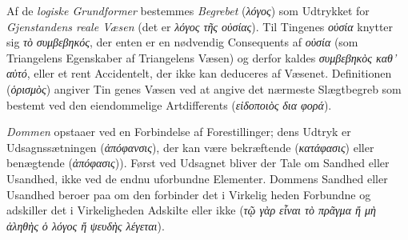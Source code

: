 \documentclass[12pt,a4paper]{book}
\newcommand{\gk}[1]{\textit{#1}}
\begin{document}
Af de \emph{logiske Grundformer} bestemmes \emph{Begrebet}
(\gk{λόγος}) som Udtrykket for \emph{Gjenstandens reale Væsen} (det
er \gk{λόγος τῆς οὐσίας}). Til Tingenes \gk{οὐσία} knytter sig \gk{τὸ}
\gk{συμβεβηκός}, der enten er en nødvendig Consequents af \gk{οὐσία}
(som Triangelens Egenskaber af Triangelens Væsen) og derfor
kaldes \gk{συμβεβηκὸς καθ' αὑτό}, eller et rent Accidentelt, der ikke
kan deduceres af Væsenet. Definitionen (\gk{ὁρισμὸς}) angiver Tin\-%
genes Væsen ved at angive det nærmeste Slægtbegreb som
bestemt ved den eiendommelige Artdifferents (\gk{εἰδοποιὸς δια\-%
φορά}).

\emph{Dommen} opstaaer ved en Forbindelse af Forestillinger;
dens Udtryk er Udsagnssætningen (\gk{ἀπόφανσις}), der kan være
bekræftende (\gk{κατάφασις}) eller benægtende (\gk{ἀπόφασις})).  Først
ved Udsagnet bliver der Tale om Sandhed eller Usandhed,
ikke ved de endnu uforbundne Elementer. Dommens Sandhed
eller Usandhed beroer paa om den forbinder det i Virkelig\-%
heden Forbundne og adskiller det i Virkeligheden Adskilte
eller ikke (\gk{τῷ γὰρ εἶναι τὸ πρᾶγμα ἤ μὴ ἀληθὴς ὁ λόγος ἤ}
\gk{ψευδὴς λέγεται}).
\end{document}
